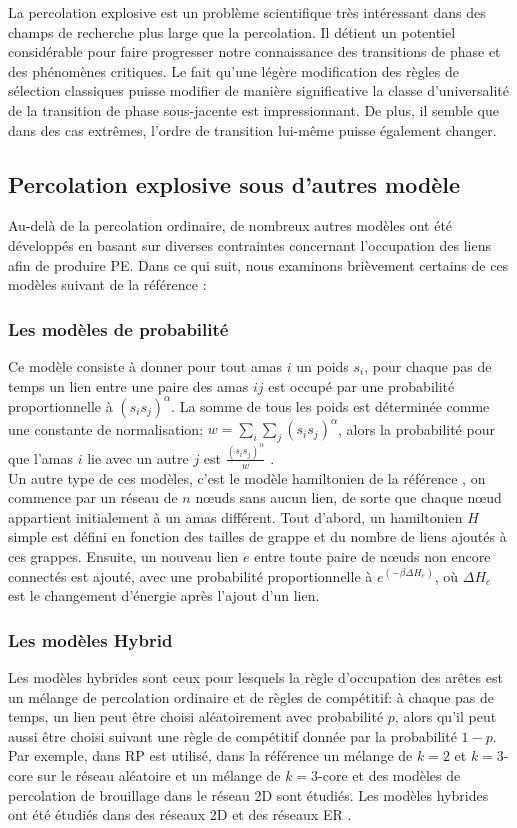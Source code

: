 La percolation explosive est un problème scientifique très intéressant dans des champs de recherche plus large que la percolation. Il détient un potentiel considérable pour faire progresser notre connaissance des transitions de phase et des phénomènes critiques. Le fait qu'une légère modification des règles de sélection classiques puisse modifier de manière significative la classe d'universalité de la transition de phase sous-jacente est impressionnant. De plus, il semble que dans des cas extrêmes, l'ordre de transition lui-même puisse également changer.

\subsection{Percolation explosive sous d'autres modèle}
Au-delà de la percolation ordinaire, de nombreux autres modèles ont été développés en basant sur diverses contraintes concernant l'occupation des liens afin de produire PE. Dans ce qui suit, nous examinons brièvement certains de ces modèles suivant de la référence \cite{Boccaletti-al2016}: 
\subsubsection{Les modèles de probabilité}
Ce modèle consiste à donner pour tout amas $i$ un poids $s_i$, pour chaque pas de temps un lien entre une paire des amas $ij$ est occupé par une probabilité proportionnelle à $(s_is_j)^{\alpha}$. La somme  de tous les poids est déterminée comme une constante de normalisation: $w=\sum_i\sum_j(s_is_j)^{\alpha}$, alors la probabilité pour que l'amas $i$ lie avec un autre $j$ est $\frac{(s_is_j)^{\alpha}}{w}$ \cite{Cho-al2010}.\\ Un autre type de ces modèles, c'est le modèle hamiltonien de la référence \cite{Moreira-al2010}, on commence par un réseau de $n$ nœuds sans aucun lien, de sorte que chaque nœud appartient initialement à un amas différent. Tout d'abord, un hamiltonien $H$ simple est défini en fonction des tailles de grappe et du nombre de liens ajoutés à ces grappes. Ensuite, un nouveau lien $e$ entre toute paire de nœuds non encore connectés est ajouté, avec une probabilité proportionnelle à $e^{(-\beta\Delta H_e)}$, où $\Delta H_e$ est le changement d'énergie après l'ajout d'un lien.

\subsubsection{Les modèles Hybrid}
Les modèles hybrides sont ceux pour lesquels la règle d'occupation des arêtes est un mélange de percolation ordinaire et de règles de compétitif: à chaque pas de temps, un lien peut être choisi aléatoirement avec probabilité $p$, alors qu'il peut aussi être choisi suivant une règle de compétitif donnée par la probabilité $1-p$. Par exemple, dans \cite{Bastas-al2014} RP est utilisé, dans la référence \cite{Cao-Schwarz2012} un mélange de $k=2$ et $k=3$-core sur le réseau aléatoire et un mélange de $k=3$-core et des modèles de percolation de brouillage dans le réseau 2D sont étudiés. Les modèles hybrides ont été étudiés dans des réseaux 2D \cite{Cao-Schwarz2012,Bastas-al2014} et des réseaux ER  \cite{Cao-Schwarz2012,Bastas-al2014,Fan-al2012}.
